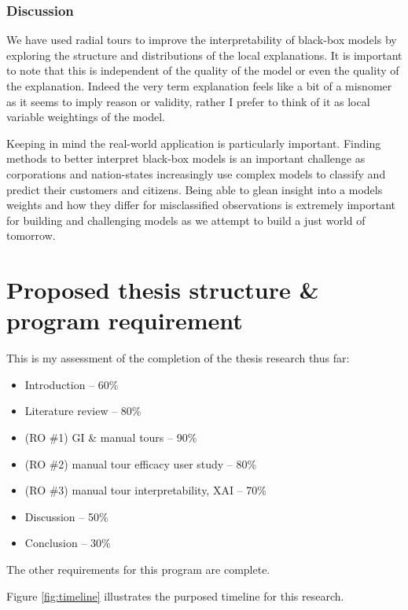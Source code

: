 \documentclass[
  11,
]{article}
\providecommand{\tightlist}{%
  \setlength{\itemsep}{0pt}\setlength{\parskip}{0pt}}
\begin{document}
\hypertarget{discussion}{%
\subsubsection{Discussion}\label{discussion}}

We have used radial tours to improve the interpretability of black-box models by exploring the structure and distributions of the local explanations. It is important to note that this is independent of the quality of the model or even the quality of the explanation. Indeed the very term explanation feels like a bit of a misnomer as it seems to imply reason or validity, rather I prefer to think of it as local variable weightings of the model.

Keeping in mind the real-world application is particularly important. Finding methods to better interpret black-box models is an important challenge as corporations and nation-states increasingly use complex models to classify and predict their customers and citizens. Being able to glean insight into a models weights and how they differ for misclassified observations is extremely important for building and challenging models as we attempt to build a just world of tomorrow.

\hypertarget{proposed-thesis-structure-program-requirement}{%
\section{Proposed thesis structure \& program requirement}\label{proposed-thesis-structure-program-requirement}}

This is my assessment of the completion of the thesis research thus far:

\begin{itemize}
\tightlist
\item
  Introduction -- 60\%
\item
  Literature review -- 80\%
\item
  (RO \#1) GI \& manual tours -- 90\%
\item
  (RO \#2) manual tour efficacy user study -- 80\%
\item
  (RO \#3) manual tour interpretability, XAI -- 70\%
\item
  Discussion -- 50\%
\item
  Conclusion -- 30\%
\end{itemize}

The other requirements for this program are complete.

Figure \ref{fig:timeline} illustrates the purposed timeline for this research.
\end{document}
